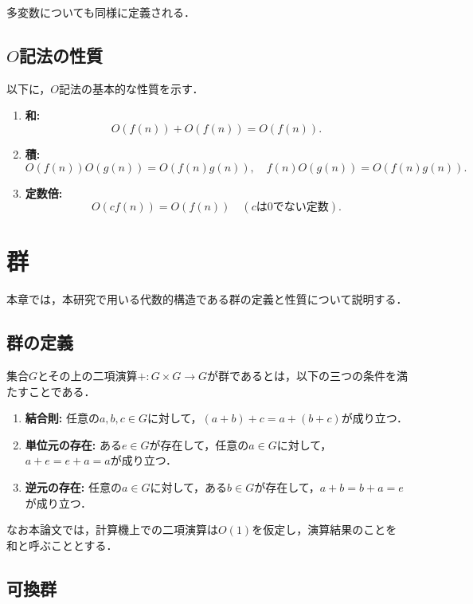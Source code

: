 \documentclass[12pt]{jsreport}
\theoremstyle{plain} %
\theoremstyle{definition}
\begin{document}
多変数についても同様に定義される．

\subsection{$O$記法の性質}

以下に，$O$記法の基本的な性質を示す．

\begin{enumerate}
    \item \textbf{和:} \[
            O(f(n)) + O(f(n)) = O(f(n)).
        \]
    \item \textbf{積:}
        \[
            O(f(n))O(g(n)) = O(f(n)g(n)), \quad f(n)O(g(n)) = O(f(n)g(n)).
        \]
    \item \textbf{定数倍:}
        \[
            O(cf(n)) = O(f(n)) \quad (cは0でない定数).
        \]
\end{enumerate}

\section{群}

本章では，本研究で用いる代数的構造である群の定義と性質について説明する\cite{book2}．

\subsection{群の定義}

集合$G$とその上の二項演算$+: G \times G \to G$が群であるとは，以下の三つの条件を満たすことである．

\begin{enumerate}
    \item \textbf{結合則:} 任意の$a, b, c \in G$に対して，$(a + b) + c = a + (b + c)$が成り立つ．
    \item \textbf{単位元の存在:} ある$e \in G$が存在して，任意の$a \in G$に対して，$a + e = e + a = a$が成り立つ．
    \item \textbf{逆元の存在:} 任意の$a \in G$に対して，ある$b \in G$が存在して，$a + b = b + a = e$が成り立つ．
\end{enumerate}

なお本論文では，計算機上での二項演算は$O(1)$を仮定し，演算結果のことを和と呼ぶこととする．

\subsection{可換群}
\end{document}
